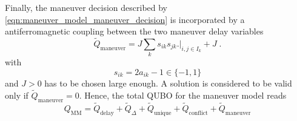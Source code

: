 \documentclass[aps,pra,twocolumn,10pt]{revtex4-1}
\begin{document}
Finally, the maneuver decision described by \eqref{eqn:maneuver_model_maneuver_decision} is incorporated by a antiferromagnetic coupling between the two maneuver delay variables
\begin{equation*}
    \tilde Q_\text{maneuver} = J \sum_k  s_{ik} s_{jk} \biggl. \biggr|_{i, j \in I_k}  + J \; .
\end{equation*}
with 
\begin{equation*}
    s_{ik} = 2 a_{ik} - 1 \in \{-1, 1\}
\end{equation*}
and $J>0$ has to be chosen large enough. 
A solution is considered to be valid only if $\tilde Q_\text{maneuver} = 0$.
Hence, the total QUBO for the maneuver model reads
\begin{equation*}
    Q_\text{MM} = \tilde Q_\text{delay} + \tilde Q_\Delta  + \tilde Q_\text{unique} + \tilde Q_\text{conflict} + \tilde Q_\text{maneuver} 
\end{equation*}


\end{document}
